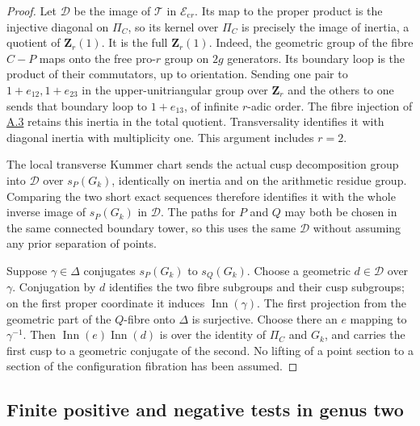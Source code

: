 \documentclass[11pt,a4paper]{article}
\newcommand{\Z}{\mathbf Z}
\newcommand{\Inn}{\operatorname{Inn}}
\newcommand{\crr}{\mathrm{c}r}
\newcommand{\statementref}[1]{\hyperlink{#1}{#1}}
\begin{document}
\begin{proof}
Let $\mathcal D$ be the image of $\mathcal T$ in
$\mathcal E_{\crr}$. Its map to the proper product is the injective
diagonal on $\Pi_C$, so its kernel over $\Pi_C$ is precisely the
image of inertia, a quotient of $\Z_r(1)$. It is the full
$\Z_r(1)$. Indeed, the geometric group of the fibre $C-P$ maps
onto the free pro-$r$ group on $2g$ generators. Its boundary loop is
the product of their commutators, up to orientation. Sending one pair
to $1+e_{12},1+e_{23}$ in the upper-unitriangular group over $\Z_r$
and the others to one sends that boundary loop to $1+e_{13}$, of
infinite $r$-adic order. The fibre injection of
\statementref{A.3} retains this inertia in the total quotient.
Transversality identifies it with diagonal inertia with multiplicity
one. This argument includes $r=2$.

The local transverse Kummer chart sends the actual cusp decomposition
group into $\mathcal D$ over $s_P(G_k)$, identically on inertia and
on the arithmetic residue group. Comparing the two short exact
sequences therefore identifies it with the whole inverse image of
$s_P(G_k)$ in $\mathcal D$. The paths for $P$ and $Q$ may both be
chosen in the same connected boundary tower, so this uses the same
$\mathcal D$ without assuming any prior separation of points.

Suppose $\gamma\in\Delta$ conjugates $s_P(G_k)$ to $s_Q(G_k)$.
Choose a geometric $d\in\mathcal D$ over $\gamma$. Conjugation by
$d$ identifies the two fibre subgroups and their cusp subgroups; on
the first proper coordinate it induces $\Inn(\gamma)$. The first
projection from the geometric part of the $Q$-fibre onto $\Delta$
is surjective. Choose there an $e$ mapping to $\gamma^{-1}$. Then
$\Inn(e)\Inn(d)$ is over the identity of $\Pi_C$ and $G_k$, and
carries the first cusp to a geometric conjugate of the second. No
lifting of a point section to a section of the configuration fibration
has been assumed.
\end{proof}

\subsection{Finite positive and negative tests in genus two}
\end{document}
